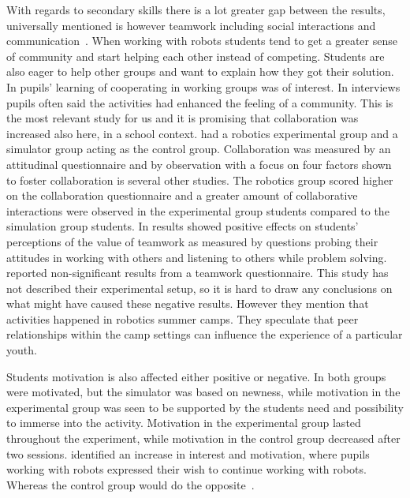 With regards to secondary skills there is a lot greater gap between the results, 
universally mentioned is however teamwork including social interactions and communication~\cite{mitnik2008autonomous,mitnik2009collaborative,nugent2009use,owens2008lego}.
When working with robots students tend to get a greater sense of community and start helping each other instead of competing. Students are also eager to help other groups and want to explain how they got their solution.
In  pupils' learning of cooperating in working groups was of interest. In interviews pupils often said the activities had enhanced the feeling of a community. This is the most relevant study for us and it is promising that collaboration was increased also here, in a school context.  had a robotics experimental group and a simulator group acting as the control group. Collaboration was measured by an attitudinal questionnaire and by observation with a focus on four factors shown to foster collaboration is several other studies. The robotics group scored higher on the collaboration questionnaire and a greater amount of collaborative interactions were observed in the experimental group students compared to the simulation group students. In  results showed positive effects on students' perceptions of the value of teamwork as measured by questions probing their attitudes in working with others and listening to others while problem solving.  reported non-significant results from a teamwork questionnaire. This study has not described their experimental setup, so it is hard to draw any conclusions on what might have caused these negative results. However they mention that activities happened in robotics summer camps. They speculate that peer relationships within the camp settings can influence the experience of a particular youth.

\bigskip\noindent
Students motivation is also affected either positive or negative. In  both groups were motivated, but the simulator was based on newness, while motivation in the experimental group was seen to be supported by the students need and possibility to immerse into the activity. Motivation in the experimental group lasted throughout the experiment, while motivation in the control group decreased after two sessions.  identified an increase in interest and motivation, where pupils working with robots expressed their wish to continue working with robots. Whereas the control group would do the opposite~\cite{nugent2008effect}. 

